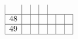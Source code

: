 \documentclass{article}
\begin{document}
{$$\begin{array}{|r|*{6}{r|}}
 & 
 & 
 & 
\\
\hline
48 
 & 
 & 
 & 
 & 
 & 
 & 
\\
\hline
49 
 & 
 & 
 & 
 & 
 & 
 & 
\\
\hline
\end{array}
$$
$$
\begin{array}{|r|*{6}{r|}}

\end{array}$$}
\end{document}
